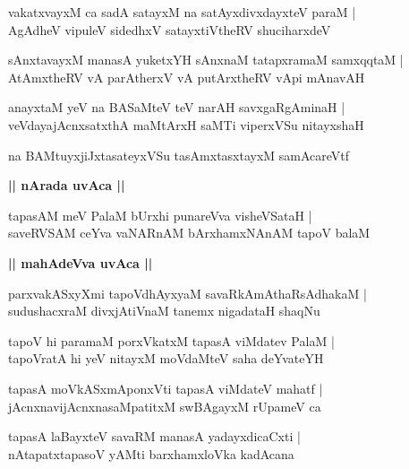 \documentclass[twoside,12pt,openright]{book}
\newcounter{shloka}[chapter]
\def\uvaca#1{\centerline{{\large\textbf{#1}}}}
\begin{document}
\begin{shloka}%
vakatxvayxM ca sadA satayxM na satAyxdivxdayxteV paraM |\\
AgAdheV vipuleV sidedhxV satayxtiVtheRV shuciharxdeV
\end{shloka}

\begin{shloka}%
sAnxtavayxM manasA yuketxYH sAnxnaM tatapxramaM samxqqtaM |\\
AtAmxtheRV vA parAtherxV vA putArxtheRV vApi mAnavAH 
\end{shloka}

\begin{shloka}%
anayxtaM yeV na BASaMteV teV narAH savxgaRgAminaH |\\
veVdayajAcnxsatxthA maMtArxH saMTi viperxVSu nitayxshaH
\end{shloka}

\begin{shloka}%
na BAMtuyxjiJxtasateyxVSu tasAmxtasxtayxM samAcareVtf
\end{shloka}

\uvaca{|| nArada uvAca ||}

\begin{shloka}%
tapasAM meV PalaM bUrxhi punareVva visheVSataH |\\
saveRVSAM ceYva vaNARnAM bArxhamxNAnAM tapoV balaM 
\end{shloka}


\uvaca{|| mahAdeVva uvAca ||}

\begin{shloka}%
parxvakASxyXmi tapoVdhAyxyaM savaRkAmAthaRsAdhakaM |\\
sudushacxraM divxjAtiVnaM tanemx nigadataH shaqNu
\end{shloka}

\begin{shloka}%
tapoV hi paramaM porxVkatxM tapasA viMdatev PalaM |\\
tapoVratA hi yeV nitayxM moVdaMteV saha deYvateYH
\end{shloka}

\begin{shloka}%
tapasA moVkASxmAponxVti tapasA viMdateV mahatf |\\
jAcnxnavijAcnxnasaMpatitxM swBAgayxM rUpameV ca 
\end{shloka}

\begin{shloka}%
tapasA laBayxteV savaRM manasA yadayxdicaCxti |\\
nAtapatxtapasoV yAMti barxhamxloVka kadAcana 
\end{shloka}
\end{document}
